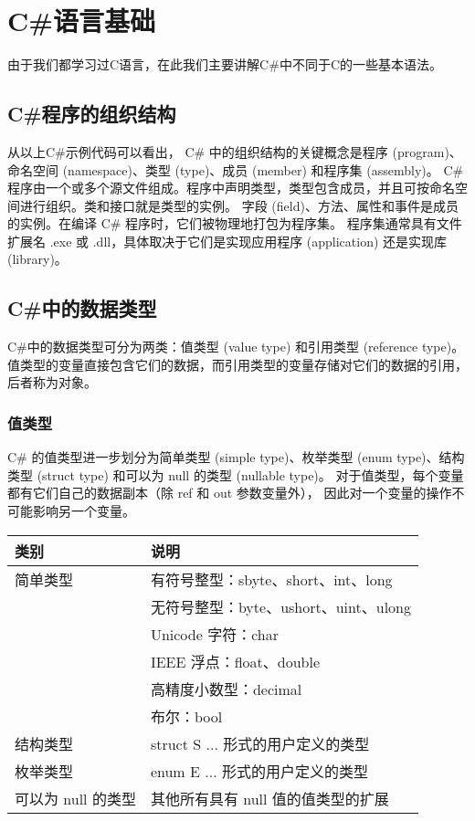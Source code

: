 ﻿%

\chapter{C\#语言基础}

由于我们都学习过C语言，在此我们主要讲解C\#中不同于C的一些基本语法。

\section{ C\#程序的组织结构}

 从以上C\#示例代码可以看出，
 C\# 中的组织结构的关键概念是程序 (program)、命名空间 (namespace)、类型 (type)、成员 (member) 和程序集 (assembly)。
 C\# 程序由一个或多个源文件组成。程序中声明类型，类型包含成员，并且可按命名空间进行组织。类和接口就是类型的实例。
 字段 (field)、方法、属性和事件是成员的实例。在编译 C\# 程序时，它们被物理地打包为程序集。
 程序集通常具有文件扩展名 .exe 或 .dll，具体取决于它们是实现应用程序 (application) 还是实现库 (library)。

\section{C\#中的数据类型}
C\#中的数据类型可分为两类：值类型 (value type) 和引用类型 (reference type)。
值类型的变量直接包含它们的数据，而引用类型的变量存储对它们的数据的引用，后者称为对象。

\subsection{值类型}
C\# 的值类型进一步划分为简单类型 (simple type)、枚举类型 (enum type)、结构类型 (struct type)
和可以为 null 的类型 (nullable type)。
对于值类型，每个变量都有它们自己的数据副本（除 ref 和 out 参数变量外），
因此对一个变量的操作不可能影响另一个变量。

\begin{tabular}{|l|l|}
\hline
类别   & 说明 \\
\hline
简单类型   & 有符号整型：sbyte、short、int、long \\
                    & 无符号整型：byte、ushort、uint、ulong \\
                    & Unicode 字符：char \\
                   &  IEEE 浮点：float、double \\
                    & 高精度小数型：decimal \\
                    & 布尔：bool \\
\hline
结构类型 & struct S {...} 形式的用户定义的类型 \\
枚举类型  & enum E {...} 形式的用户定义的类型 \\
可以为 null 的类型 & 其他所有具有 null 值的值类型的扩展 \\
\hline
\end{tabular}


